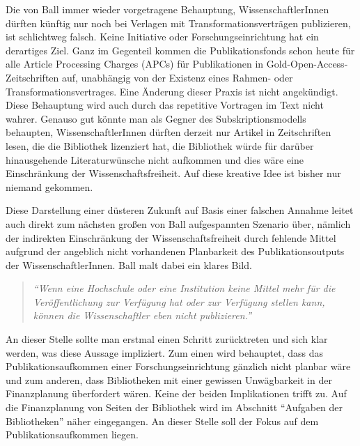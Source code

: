 \documentclass[a4paper,
fontsize=11pt,
oneside,
numbers=noperiodatend,
parskip=half-,
bibliography=totoc,
final
]{scrartcl}
\begin{document}
Die von Ball immer wieder vorgetragene Behauptung, WissenschaftlerInnen
dürften künftig nur noch bei Verlagen mit Transformationsverträgen
publizieren, ist schlichtweg falsch. Keine Initiative oder
Forschungseinrichtung hat ein derartiges Ziel. Ganz im Gegenteil kommen
die Publikationsfonds schon heute für alle Article Processing Charges
(APCs) für Publikationen in Gold-Open-Access-Zeitschriften auf,
unabhängig von der Existenz eines Rahmen- oder Transformationsvertrages.
Eine Änderung dieser Praxis ist nicht angekündigt. Diese Behauptung wird
auch durch das repetitive Vortragen im Text nicht wahrer. Genauso gut
könnte man als Gegner des Subskriptionsmodells behaupten,
WissenschaftlerInnen dürften derzeit nur Artikel in Zeitschriften lesen,
die die Bibliothek lizenziert hat, die Bibliothek würde für darüber
hinausgehende Literaturwünsche nicht aufkommen und dies wäre eine
Einschränkung der Wissenschaftsfreiheit. Auf diese kreative Idee ist
bisher nur niemand gekommen.

Diese Darstellung einer düsteren Zukunft auf Basis einer falschen
Annahme leitet auch direkt zum nächsten großen von Ball aufgespannten
Szenario über, nämlich der indirekten Einschränkung der
Wissenschaftsfreiheit durch fehlende Mittel aufgrund der angeblich nicht
vorhandenen Planbarkeit des Publikationsoutputs der
WissenschaftlerInnen. Ball malt dabei ein klares Bild.

\begin{quote}
\emph{\enquote{Wenn eine Hochschule oder eine Institution keine Mittel
mehr für die Veröffentlichung zur Verfügung hat oder zur Verfügung
stellen kann, können die Wissenschaftler eben nicht publizieren.}}
\end{quote}

An dieser Stelle sollte man erstmal einen Schritt zurücktreten und sich
klar werden, was diese Aussage impliziert. Zum einen wird behauptet,
dass das Publikationsaufkommen einer Forschungseinrichtung gänzlich
nicht planbar wäre und zum anderen, dass Bibliotheken mit einer gewissen
Unwägbarkeit in der Finanzplanung überfordert wären. Keine der beiden
Implikationen trifft zu. Auf die Finanzplanung von Seiten der Bibliothek
wird im Abschnitt \enquote{Aufgaben der Bibliotheken} näher eingegangen.
An dieser Stelle soll der Fokus auf dem Publikationsaufkommen liegen.
\end{document}
